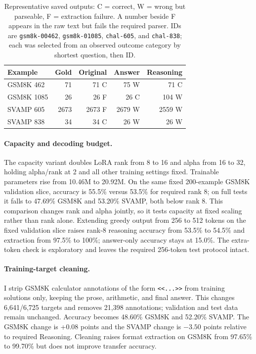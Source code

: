 \documentclass[11pt]{article}
\begin{document}
\begin{table}[t]
\centering
\scriptsize
\setlength{\tabcolsep}{3.2pt}
\begin{tabular}{@{}lrrrr@{}}
\toprule
Example & Gold & Original & Answer & Reasoning \\
\midrule
GSM8K 462 & 71 & 71 C & 75 W & 71 C \\
GSM8K 1085 & 26 & 26 F & 26 C & 104 W \\
SVAMP 605 & 2673 & 2673 F & 2679 W & 2559 W \\
SVAMP 838 & 34 & 34 C & 26 W & 26 W \\
\bottomrule
\end{tabular}
\caption{Representative saved outputs: C = correct, W = wrong but parseable, F = extraction failure. A number beside F appears in the raw text but fails the required parser. IDs are \texttt{gsm8k-00462}, \texttt{gsm8k-01085}, \texttt{chal-605}, and \texttt{chal-838}; each was selected from an observed outcome category by shortest question, then ID.}
\label{tab:cases}
\end{table}

\paragraph{Capacity and decoding budget.} The capacity variant doubles LoRA rank from 8 to 16 and alpha from 16 to 32, holding alpha/rank at 2 and all other training settings fixed. Trainable parameters rise from 10.46M to 20.92M. On the same fixed 200-example GSM8K validation slice, accuracy is 55.5\% versus 53.5\% for required rank 8; on full tests it falls to 47.69\% GSM8K and 53.20\% SVAMP, both below rank 8. This comparison changes rank and alpha jointly, so it tests capacity at fixed scaling rather than rank alone. Extending greedy output from 256 to 512 tokens on the fixed validation slice raises rank-8 reasoning accuracy from 53.5\% to 54.5\% and extraction from 97.5\% to 100\%; answer-only accuracy stays at 15.0\%. The extra-token check is exploratory and leaves the required 256-token test protocol intact.

\paragraph{Training-target cleaning.} I strip GSM8K calculator annotations of the form \verb|<<...>>| from training solutions only, keeping the prose, arithmetic, and final answer. This changes 6,641/6,725 targets and removes 21,398 annotations; validation and test data remain unchanged. Accuracy becomes 48.60\% GSM8K and 52.20\% SVAMP. The GSM8K change is +0.08 points and the SVAMP change is $-3.50$ points relative to required Reasoning. Cleaning raises format extraction on GSM8K from 97.65\% to 99.70\% but does not improve transfer accuracy.
\end{document}
